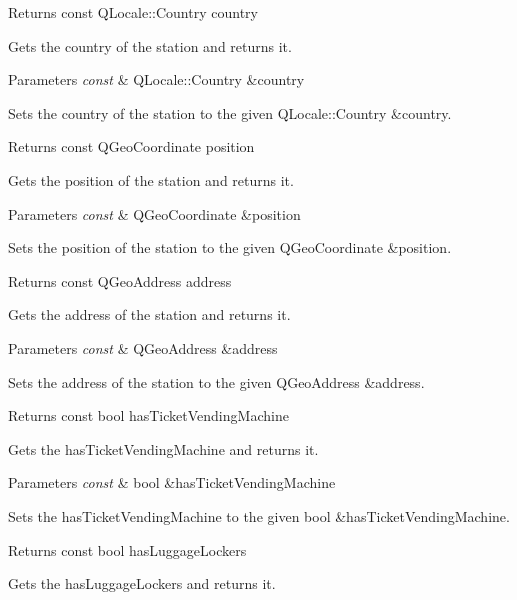 \begin{DoxyReturn}{Returns}
const Q\+Locale\+::\+Country country
\end{DoxyReturn}
Gets the country of the station and returns it.


\begin{DoxyParams}{Parameters}
{\em const} & Q\+Locale\+::\+Country \&country\\
\hline
\end{DoxyParams}
Sets the country of the station to the given Q\+Locale\+::\+Country \&country.

\begin{DoxyReturn}{Returns}
const Q\+Geo\+Coordinate position
\end{DoxyReturn}
Gets the position of the station and returns it.


\begin{DoxyParams}{Parameters}
{\em const} & Q\+Geo\+Coordinate \&position\\
\hline
\end{DoxyParams}
Sets the position of the station to the given Q\+Geo\+Coordinate \&position.

\begin{DoxyReturn}{Returns}
const Q\+Geo\+Address address
\end{DoxyReturn}
Gets the address of the station and returns it.


\begin{DoxyParams}{Parameters}
{\em const} & Q\+Geo\+Address \&address\\
\hline
\end{DoxyParams}
Sets the address of the station to the given Q\+Geo\+Address \&address.

\begin{DoxyReturn}{Returns}
const bool has\+Ticket\+Vending\+Machine
\end{DoxyReturn}
Gets the has\+Ticket\+Vending\+Machine and returns it.


\begin{DoxyParams}{Parameters}
{\em const} & bool \&has\+Ticket\+Vending\+Machine\\
\hline
\end{DoxyParams}
Sets the has\+Ticket\+Vending\+Machine to the given bool \&has\+Ticket\+Vending\+Machine.

\begin{DoxyReturn}{Returns}
const bool has\+Luggage\+Lockers
\end{DoxyReturn}
Gets the has\+Luggage\+Lockers and returns it.


